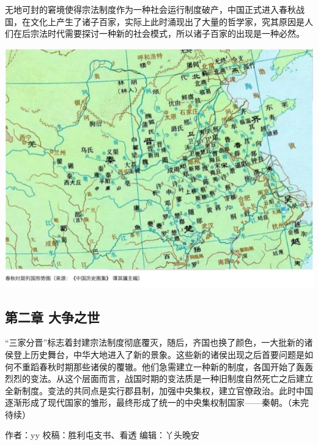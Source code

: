 \documentclass[]{book}
\begin{document}
无地可封的窘境使得宗法制度作为一种社会运行制度破产，中国正式进入春秋战国，在文化上产生了诸子百家，实际上此时涌现出了大量的哲学家，究其原因是人们在后宗法时代需要探讨一种新的社会模式，所以诸子百家的出现是一种必然。

\includegraphics[width=8.33in]{images/gx4}

\subsection{第二章 大争之世}\label{-}

``三家分晋''标志着封建宗法制度彻底覆灭，随后，齐国也换了颜色，一大批新的诸侯登上历史舞台，中华大地进入了新的景象。这些新的诸侯出现之后首要问题是如何不重蹈春秋时期那些诸侯的覆辙。他们急需建立一种新的制度，各国开始了轰轰烈烈的变法。从这个层面而言，战国时期的变法质是一种旧制度自然死亡之后建立全新制度。变法的共同点是实行郡县制，加强中央集权，建立官僚政治。此时中国逐渐形成了现代国家的雏形，最终形成了统一的中央集权制国家------秦朝。（未完待续）

作者：yy 校稿：胜利屯支书、看透 编辑：丫头晚安


\end{document}
